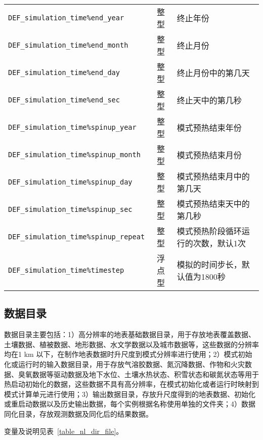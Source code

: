 \begin{table}[!htbp]
\begin{tabular}{lcp{}}
\texttt{DEF\_simulation\_time\%end\_year} & 整型 & 终止年份 \\
\texttt{DEF\_simulation\_time\%end\_month} & 整型 & 终止月份 \\
\texttt{DEF\_simulation\_time\%end\_day} & 整型 & 终止月份中的第几天 \\
\texttt{DEF\_simulation\_time\%end\_sec} & 整型 & 终止天中的第几秒 \\
\texttt{DEF\_simulation\_time\%spinup\_year} & 整型 & 模式预热结束年份 \\
\texttt{DEF\_simulation\_time\%spinup\_month} & 整型 & 模式预热结束月份 \\
\texttt{DEF\_simulation\_time\%spinup\_day} & 整型 & 模式预热结束月中的第几天 \\
\texttt{DEF\_simulation\_time\%spinup\_sec} & 整型 & 模式预热结束天中的第几秒 \\
\texttt{DEF\_simulation\_time\%spinup\_repeat} & 整型 & 模式预热阶段循环运行的次数，默认1次 \\
\texttt{DEF\_simulation\_time\%timestep} & 浮点型 & 模拟的时间步长，默认值为1800秒 \\
\bottomrule
\end{tabular}
\end{table}

\subsection{数据目录}

数据目录主要包括：1）高分辨率的地表基础数据目录，用于存放地表覆盖数据、土壤数据、植被数据、地形数据、水文学数据以及城市数据等，这些数据的分辨率均在1 km 以下，在制作地表数据时升尺度到模式分辨率进行使用；2）模式初始化或运行时的输入数据目录，用于存放气溶胶数据、氮沉降数据、作物和火灾数据、臭氧数据等驱动数据及地下水位、土壤水热状态、积雪状态和碳氮状态等用于热启动初始化的数据，这些数据不具有高分辨率，在模式初始化或者运行时映射到模式计算单元进行使用；3）输出数据目录，存放升尺度得到的地表数据、初始化或重启动数据以及历史输出数据，每个实例根据名称使用单独的文件夹；4）数据同化目录，存放观测数据及同化后的结果数据。

变量及说明见表~\ref{table_nl_dir_file}。

